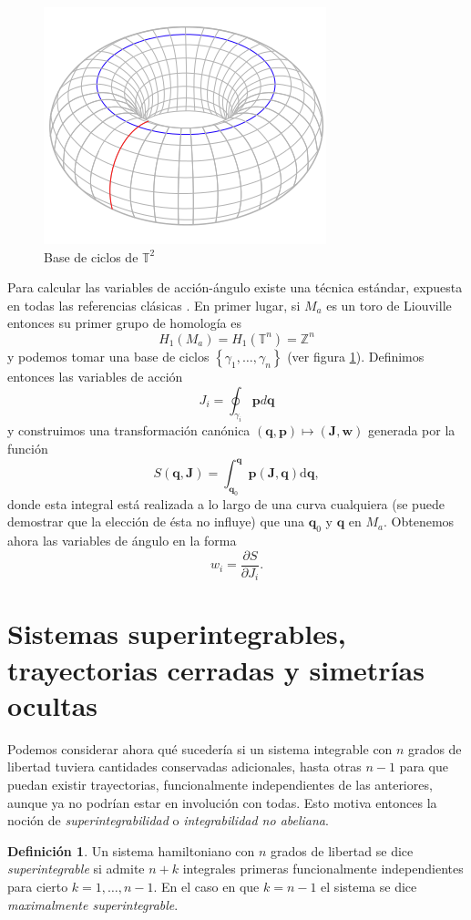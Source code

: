 \documentclass[12pt,a4paper,twoside]{article}
\theoremstyle{definition} \newtheorem{defn}[thm]{Definición}
\theoremstyle{definition} \newtheorem{ejemplo}[thm]{Ejemplo}
\theoremstyle{definition} \newtheorem{ejercicio}[thm]{Ejercicio}
\theoremstyle{remark} \newtheorem*{obs}{Observación}
\def\TT{\mathbb{T}}
\def\dd{\mathrm{d}}
\newcommand{\vect}[1]{\mathbf{#1}}
\begin{document}
       \begin{figure}[h]
	 \centering
	 \includegraphics[width=.4\textwidth]{homology}
	 \caption{\small Base de ciclos de $\TT^2$}
	 \label{fig:toro}
       \end{figure}

       Para calcular las variables de acción-ángulo existe una técnica estándar, expuesta en todas las referencias clásicas \cite{arnold,goldstein,landau}. En primer lugar, si $M_a$ es un toro de Liouville entonces su primer grupo de homología es
       \begin{equation*}
	 H_1(M_a)=H_1(\mathbb{T} ^n)=\mathbb{Z} ^n
       \end{equation*}
       y podemos tomar una base de ciclos $\left\{ \gamma_1,\dots,\gamma_n \right\}$ (ver figura \ref{fig:toro}). Definimos entonces las variables de acción
       \begin{equation}
	 J_i=\oint_{\gamma_i} \vect{p} d \vect{q}
       \end{equation}
       y construimos una transformación canónica $(\vect{q},\vect{p})\mapsto (\vect{J},\vect{w})$ generada por la función
       \begin{equation}
	 S(\vect{q},\vect{J})=\int_{\vect{q}_0}^{\vect{q}}\vect{p}(\vect{J},\vect{q}) \dd \vect{q} ,	
       \end{equation}
       donde esta integral está realizada a lo largo de una curva cualquiera (se puede demostrar que la elección de ésta no influye) que una $\vect{q}_0$ y $\vect{q}$ en $M_a$. Obtenemos ahora las variables de ángulo en la forma
       \begin{equation}
	 w_i=\frac{\partial S}{\partial J_i}. 
       \end{equation}

  \section{Sistemas superintegrables, trayectorias cerradas y simetrías ocultas}
  Podemos considerar ahora qué sucedería si un sistema integrable con $n$ grados de libertad tuviera cantidades conservadas adicionales, hasta otras $n-1$ para que puedan existir trayectorias, funcionalmente independientes de las anteriores, aunque ya no podrían estar en involución con todas. Esto motiva entonces la noción de \emph{superintegrabilidad} o \emph{integrabilidad no abeliana}.
  \begin{defn}
    Un sistema hamiltoniano con $n$ grados de libertad se dice \emph{superintegrable} si admite $n+k$ integrales primeras funcionalmente independientes para cierto $k=1,\dots,n-1$. En el caso en que $k=n-1$ el sistema se dice \emph{maximalmente superintegrable}.
  \end{defn}
\end{document}
